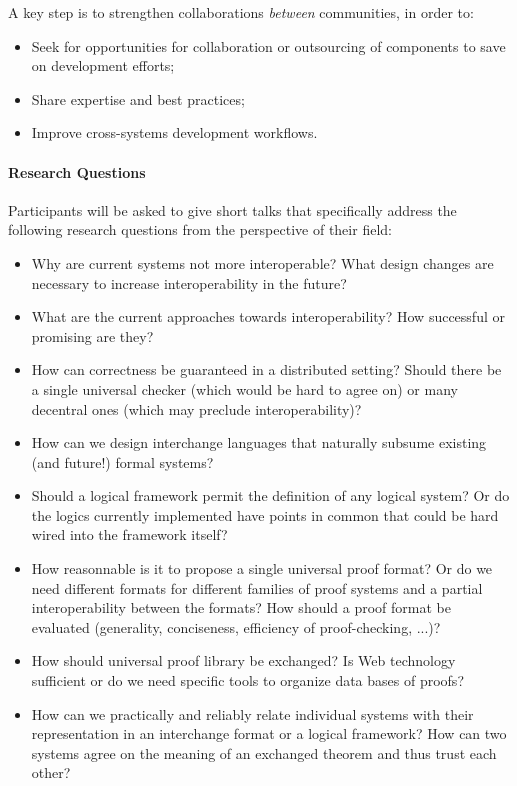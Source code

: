 A key step is to strengthen collaborations \emph{between} communities, in order
to:
\begin{itemize}
\item Seek for opportunities for collaboration or outsourcing of
  components to save on development efforts;
\item Share expertise and best practices;
\item Improve cross-systems development workflows.
\end{itemize}

\paragraph{Research Questions}
Participants will be asked to give short talks that specifically address the following research questions from the perspective of their field:

\begin{itemize}
\item Why are current systems not more interoperable? What design changes are necessary to increase interoperability in the future?
\item What are the current approaches towards interoperability? How successful or promising are they?
\item How can correctness be guaranteed in a distributed setting?
 Should there be a single universal checker (which would be hard to agree on) or many decentral ones (which may preclude interoperability)?
\item How can we design interchange languages that naturally subsume
  existing (and future!) formal systems?
\item Should a logical framework permit the definition of any logical system?
Or do the logics currently implemented have points in common that could
be hard wired into the framework itself?
\item How reasonnable is it to propose a single universal proof format?
Or do we need different formats for different families of
proof systems and a partial interoperability between the formats?
 How should a proof format be evaluated (generality, conciseness,
efficiency of proof-checking, ...)?
\item How should universal proof library be exchanged? Is Web technology
sufficient or do we need specific tools to organize data bases of
proofs?
\item How can we practically and reliably relate individual systems with their representation in an interchange format or a logical framework?
How can two systems agree on the meaning of an exchanged theorem and thus trust each other?
\end{itemize}

